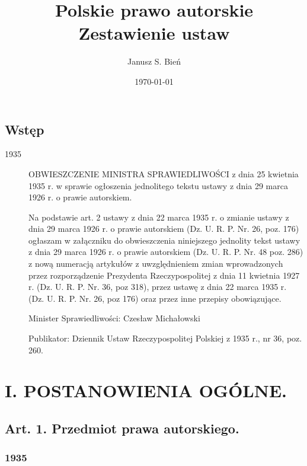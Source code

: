 \documentclass[withmarginpar]{book}
\begin{document}
\title{Polskie prawo autorskie\\Zestawienie ustaw}

\author{Janusz S. Bień}

\date{\today}


\maketitle


\section{Wstęp}
\label{sec:wstęp}

\begin{description}
\item[1935] OBWIESZCZENIE MINISTRA SPRAWIEDLIWOŚCI z dnia 25 kwietnia
  1935 r.  w sprawie ogłoszenia jednolitego tekstu ustawy z dnia 29
  marca 1926 r. o prawie autorskiem.

  Na podstawie art. 2 ustawy z dnia 22 marca 1935 r. o zmianie ustawy
  z dnia 29 marca 1926 r. o prawie autorskiem (Dz. U. R. P. Nr. 26,
  poz. 176) ogłaszam w załączniku do obwieszczenia niniejszego
  jednolity tekst ustawy z dnia 29 marca 1926 r. o prawie autorskiem
  (Dz. U. R. P. Nr. 48 poz. 286) z nową numeracją artykułów z
  uwzględnieniem zmian wprowadzonych przez rozporządzenie Prezydenta
  Rzeczypospolitej z dnia 11 kwietnia 1927 r. (Dz. U. R. P. Nr. 36,
  poz 318), przez ustawę z dnia 22 marca 1935 r. (Dz. U. R. P. Nr. 26,
  poz 176) oraz przez inne przepisy obowiązujące.

Minister Sprawiedliwości: Czesław Michałowski

Publikator: Dziennik Ustaw Rzeczypospolitej Polskiej z 1935 r., nr 36, poz. 260.

\end{description}

\chapter{I. POSTANOWIENIA OGÓLNE.}
\label{cha:i.-post-ogoln}

\section{Art. 1.  Przedmiot prawa autorskiego.}
\label{sec:art.-1}

\subsection{1935}
\label{sec:art.-1-1}
\end{document}
